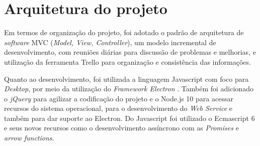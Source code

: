\documentclass[
	12pt,				%
	openright,			%
	oneside,			%
	a4paper,			%
	english,			%
	brazil				%
	]{abntex2}
\begin{document}
		
\chapter{Arquitetura do projeto}\label{cap_trabalho_academico}
	Em termos de organização do projeto, foi adotado o padrão de arquitetura de \emph{software} MVC (\emph{Model, View, Controller}), um modelo incremental de desenvolvimento, com reuniões diárias para discussão de problemas e melhorias, e utilização da ferramenta Trello \cite{trello} para organização e consistência das informações.
	\par
	Quanto ao desenvolvimento, foi utilizada a linguagem Javascript com foco para \emph{Desktop}, por meio da utilização do \emph{Framework Electron} \cite{electron}.
	Também foi adicionado o \emph{jQuery} para agilizar a codificação do projeto e o Node.js 10 \cite{nodejs} para acessar recursos do sistema operacional, para o desenvolvimento do \emph{Web Service} e também para dar suporte ao Electron.
	Do Javascript foi utilizado o Ecmascript 6 e seus novos recursos como o desenvolvimento assíncrono com as \emph{Promises} e \emph{arrow functions}.
	
\end{document}
